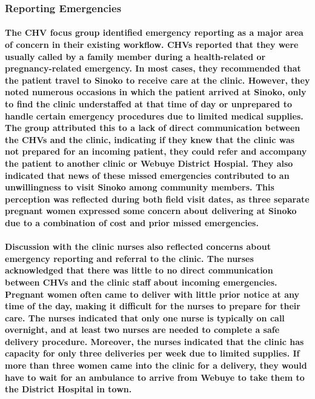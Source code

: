 \subsubsection{Reporting Emergencies}
\paragraph{The CHV focus group identified emergency reporting as a major area of concern in their existing workflow. CHVs reported that they were usually called by a family member during a health-related or pregnancy-related emergency. In most cases, they recommended that the patient travel to Sinoko to receive care at the clinic. However, they noted numerous occasions in which the patient arrived at Sinoko, only to find the clinic understaffed at that time of day or unprepared to  handle certain emergency procedures due to limited medical supplies. The group attributed this to a lack of direct communication between the CHVs and the clinic, indicating if they knew that the clinic was not prepared for an incoming patient, they could refer and accompany the patient to another clinic or Webuye District Hospial. They also indicated that news of these missed emergencies contributed to an unwillingness to visit Sinoko among community members. This perception was reflected during both field visit dates, as three separate pregnant women expressed some concern about delivering at Sinoko due to a combination of cost and prior missed emergencies.}

\paragraph{Discussion with the clinic nurses also reflected concerns about emergency reporting and referral to the clinic. The nurses acknowledged that there was little to no direct communication between CHVs and the clinic staff about incoming emergencies. Pregnant women often came to deliver with little prior notice at any time of the day, making it difficult for the nurses to prepare for their care. The nurses indicated that only one nurse is typically on call overnight, and at least two nurses are needed to complete a safe delivery procedure. Moreover, the nurses indicated that the clinic has capacity for only three deliveries per week due to limited supplies. If more than three women came into the clinic for a delivery, they would have to wait for an ambulance to arrive from Webuye to take them to the District Hospital in town.}

